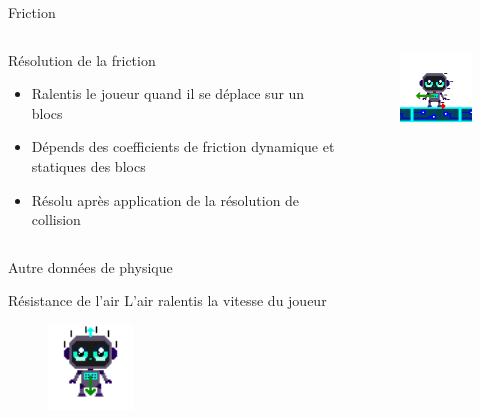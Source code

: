 \documentclass{beamer}
\begin{document}
{\begin{frame}{Friction}
    \begin{columns}
        \begin{block}{Résolution de la friction}
            \begin{itemize}
                \item[\bullet] Ralentis le joueur quand il se déplace sur un blocs
                \item[\bullet] Dépends des coefficients de friction dynamique et statiques des blocs
                \item[\bullet] Résolu après application de la résolution de collision
            \end{itemize}
        \end{block}
        \begin{figure}
            \centering
            \includegraphics[width=1.0\textwidth]{images/Friction.png}
        \end{figure}
    \end{columns}
\end{frame}

\begin{frame}{Autre données de physique}
    \begin{block}{Résistance de l'air}
        L'air ralentis la vitesse du joueur
        \begin{figure}
            \centering
            \includegraphics[width=0.2\textwidth]{images/Airresistance.png}
        \end{figure}
    \end{block}


\end{frame}}
\end{document}
